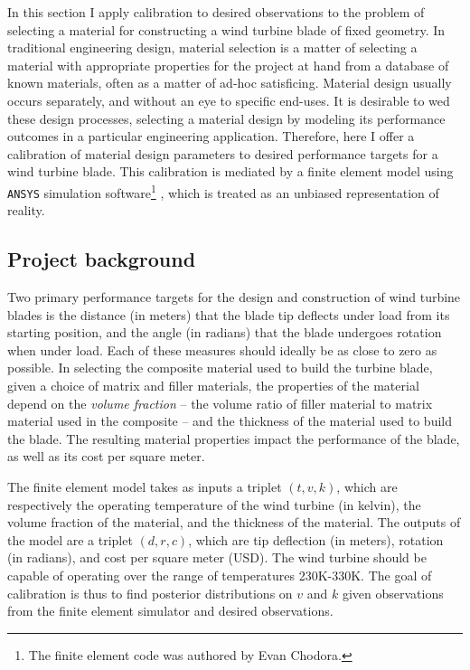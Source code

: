 \documentclass{article}
\begin{document}
In this section I apply calibration to desired observations to the problem of selecting a material for constructing a wind turbine blade of fixed geometry. In traditional engineering design, material selection is a matter of selecting a material with appropriate properties for the project at hand from a database of known materials, often as a matter of ad-hoc satisficing. Material design usually occurs separately, and without an eye to specific end-uses. It is desirable to wed these design processes, selecting a material design by modeling its performance outcomes in a particular engineering application. Therefore, here I offer a calibration of material design parameters to desired performance targets for a wind turbine blade. This calibration is mediated by a finite element model using \texttt{ANSYS} simulation software\footnote{
The finite element code was authored by Evan Chodora.
}
, which is treated as an unbiased representation of reality.

\subsection{Project background}

Two primary performance targets for the design and construction of wind turbine blades is the distance (in meters) that the blade tip deflects under load from its starting position, and the angle (in radians) that the blade undergoes rotation when under load. Each of these measures should ideally be as close to zero as possible. In selecting the composite material used to build the turbine blade, given a choice of matrix and filler materials, the properties of the material depend on the \textit{volume fraction} -- the volume ratio of filler material to matrix material used in the composite -- and the thickness of the material used to build the blade. The resulting material properties impact the performance of the blade, as well as its cost per square meter. 

The finite element model takes as inputs a triplet $(t,v,k)$, which are respectively the operating temperature of the wind turbine (in kelvin), the volume fraction of the material, and the thickness of the material. The outputs of the model are a triplet $(d,r,c)$, which are tip deflection (in meters), rotation (in radians), and cost per square meter (USD). The wind turbine should be capable of operating over the range of temperatures 230K-330K. The goal of calibration is thus to find posterior distributions on $v$ and $k$ given observations from the finite element simulator and desired observations.
\end{document}
